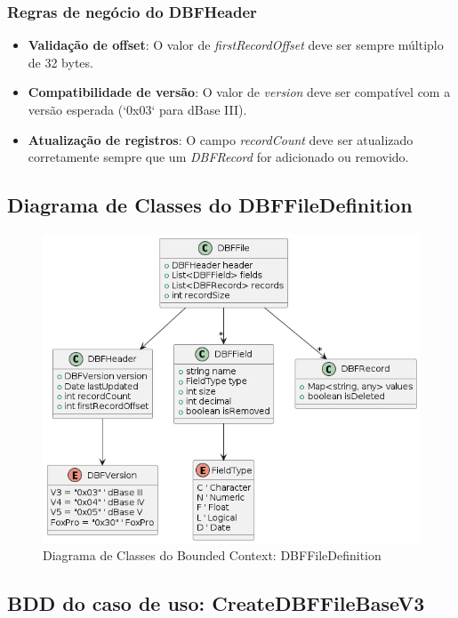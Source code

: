 \subsubsection{Regras de negócio do DBFHeader}
\begin{itemize}
    \item \textbf{Validação de offset}: O valor de \textit{firstRecordOffset} deve ser sempre múltiplo de 32 bytes.
    \item \textbf{Compatibilidade de versão}: O valor de \textit{version} deve ser compatível com a versão esperada (`0x03` para dBase III).
    \item \textbf{Atualização de registros}: O campo \textit{recordCount} deve ser atualizado corretamente sempre que um \textit{DBFRecord} for adicionado ou removido.
\end{itemize}



\subsection{Diagrama de Classes do DBFFileDefinition}
\begin{figure}[H]
    \centering
    \includegraphics[width=1\textwidth]{image/uml_DBFESTRUCTURE.png}
    \caption{Diagrama de Classes do Bounded Context: DBFFileDefinition}
\end{figure}

\subsection{BDD do caso de uso: CreateDBFFileBaseV3}
